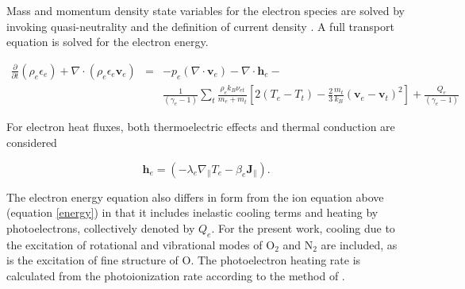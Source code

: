 \documentclass[11pt,letterpaper]{article}
\begin{document}
Mass and momentum density state variables for the electron species are solved by invoking quasi-neutrality and the definition of current density \citep[c.f.][equations 25 and 26]{Zettergren:2012}. A full transport equation is solved for the electron energy. 
\begin{linenomath*} \begin{eqnarray}
\frac{\partial}{\partial t} \left( \rho_e \epsilon_e \right) + \nabla \cdot \left( \rho_e \epsilon_e \mathbf{v}_e \right) &=& - p_e (\nabla \cdot \mathbf{v}_e) - \nabla \cdot \mathbf{h}_e - \\
\nonumber&& \frac{1}{(\gamma_e - 1 )}\sum_t \frac{\rho_e k_B \nu_{et}}{m_e + m_t}\left[ 2 (T_e-T_t) - \frac{2}{3} \frac{m_t}{k_B}(\mathbf{v}_e-\mathbf{v}_t)^2 \right] + \frac{Q_e}{(\gamma_e - 1 )}\label{energye}
\end{eqnarray} \end{linenomath*}
For electron heat fluxes, both thermoelectric effects \citep{Schunk:1978} and thermal conduction are considered \citep{Banks:1973,Huba:2000}
\begin{linenomath*} \begin{equation}
\mathbf{h}_e = \left( - \lambda_e \nabla_{\parallel} T_e - \beta_e \mathbf{J}_{\parallel} \right).
\end{equation} \end{linenomath*}
The electron energy equation also differs in form from the ion equation above (equation \ref{energy}) in that it includes inelastic cooling terms and heating by photoelectrons, collectively denoted by $Q_e$. For the present work, cooling due to the excitation of rotational and vibrational modes of O$_2$ and N$_2$ are included, as is the excitation of fine structure of O. The photoelectron heating rate is calculated from the photoionization rate according to the method of \citet{Swartz:1972}.
\end{document}
